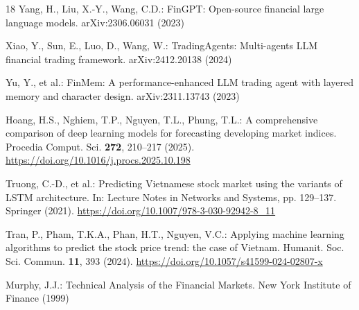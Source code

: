 \documentclass[runningheads]{llncs}
\begin{document}
\begin{thebibliography}{18}
Yang, H., Liu, X.-Y., Wang, C.D.: FinGPT: Open-source financial large language
models. arXiv:2306.06031 (2023)

Xiao, Y., Sun, E., Luo, D., Wang, W.: TradingAgents: Multi-agents LLM financial
trading framework. arXiv:2412.20138 (2024)

Yu, Y., et al.: FinMem: A performance-enhanced LLM trading agent with layered
memory and character design. arXiv:2311.13743 (2023)

Hoang, H.S., Nghiem, T.P., Nguyen, T.L., Phung, T.L.: A comprehensive comparison of
deep learning models for forecasting developing market indices. Procedia Comput.
Sci. \textbf{272}, 210--217 (2025).
\url{https://doi.org/10.1016/j.procs.2025.10.198}

Truong, C.-D., et al.: Predicting Vietnamese stock market using the variants of
LSTM architecture. In: Lecture Notes in Networks and Systems, pp. 129--137.
Springer (2021). \url{https://doi.org/10.1007/978-3-030-92942-8_11}

Tran, P., Pham, T.K.A., Phan, H.T., Nguyen, V.C.: Applying machine learning
algorithms to predict the stock price trend: the case of Vietnam. Humanit. Soc.
Sci. Commun. \textbf{11}, 393 (2024).
\url{https://doi.org/10.1057/s41599-024-02807-x}

Murphy, J.J.: Technical Analysis of the Financial Markets. New York Institute of
Finance (1999)

\end{thebibliography}
\end{document}
